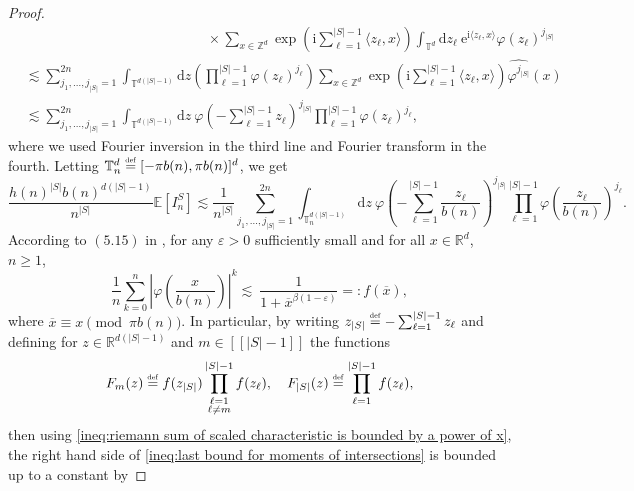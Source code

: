 \documentclass[10pt,a4paper]{amsart}
\newcommand{\RR}{\mathbb R}
\newcommand{\EE}{\mathbb E}
\newcommand{\TT}{\mathbb T}
\newcommand{\1}{\mathds{1}}
\newcommand{\ZZ}{\mathbb Z}
\renewcommand{\d}{\mathrm d}
\renewcommand{\i}{\mathrm i}
\newcommand{\eqdef}{\stackrel{\scaleto{\mathrm{def}}{3.5pt}}{=}}
\numberwithin{equation}{section}
\begin{document}
\begin{proof}
\begin{align*}
        &\hspace{13em}\times\sum_{x\in\ZZ^d}\exp\left(\i\sum_{\ell=1}^{|S|-1}\langle z_\ell, x\rangle\right)\int_{\TT^d}\d z_{\ell}\ \mathrm e^{\i\langle z_\ell,x\rangle}\varphi(z_\ell)^{j_{|S|}}\\
        &\lesssim\sum_{j_1,\dots,j_{|S|}=1}^{2n}\int_{\TT^{d(|S|-1)}}\d z\left(\prod_{\ell=1}^{|S|-1}\varphi(z_\ell)^{j_\ell}\right)\sum_{x\in\ZZ^d}\exp\left(\i\sum_{\ell=1}^{|S|-1}\langle z_\ell,x\rangle\right)\widehat{\varphi^{j_{|S|}}}(x)\\
        &\lesssim\sum_{j_1,\dots,j_{|S|}=1}^{2n}\int_{\TT^{d(|S|-1)}}\d z\ \varphi\left(-\sum_{\ell=1}^{|S|-1}z_\ell\right)^{j_{|S|}}\prod_{\ell=1}^{|S|-1}\varphi(z_\ell)^{j_\ell},
    \end{align*}
    where we used Fourier inversion in the third line and Fourier transform in the fourth. Letting $\TT_n^d\eqdef[-\pi b(n),\pi b(n)]^d$, we get
    \begin{equation}
    \label{ineq:last bound for moments of intersections}
        \frac{h(n)^{|S|}b(n)^{d(|S|-1)}}{n^{|S|}}\EE\left[I_n^S\right]\lesssim\frac{1}{n^{|S|}}\sum_{j_1,\dots,j_{|S|}=1}^{2n}\int_{\TT_n^{d(|S|-1)}}\d z\ \varphi\left(-\sum_{\ell=1}^{|S|-1}\frac{z_\ell}{b(n)}\right)^{j_{|S|}}\prod_{\ell=1}^{|S|-1}\varphi\left(\frac{z_\ell}{b(n)}\right)^{j_\ell}.
    \end{equation}
    According to $(5.15)$ in \cite{RosenRandomWalks&IntersectionLocalTimes1990}, for any $\varepsilon>0$ sufficiently small and for all $x\in\RR^d$, $n\ge1$,
    \begin{equation}
    \label{ineq:riemann sum of scaled characteristic is bounded by a power of x}
        \frac{1}{n}\sum_{k=0}^n\left|\varphi\left(\frac{x}{b(n)}\right)\right|^k\lesssim\ \frac{1}{1+\overline x^{\beta(1-\varepsilon)}}=:f(\overline x),
    \end{equation}
    where $\overline{x}\equiv x\pmod{\pi b(n)} $. In particular, by writing $z_{|S|}\eqdef-\sum_{\ell=1}^{|S|-1}z_\ell$ and defining for $z\in\RR^{d(|S|-1)}$ and $m\in[\![|S|-1]\!]$ the functions
    \begin{equation*}
        F_m(z)\eqdef f(z_{|S|})\prod_{\substack{\ell=1 \\ \ell\ne m}}^{|S|-1}f(z_\ell),\quad  
        F_{|S|}(z)\eqdef\prod_{\ell=1}^{|S|-1}f(z_\ell),
    \end{equation*}
    then using \eqref{ineq:riemann sum of scaled characteristic is bounded by a power of x}, the right hand side of \eqref{ineq:last bound for moments of intersections} is bounded up to a constant by 

\end{proof}
\end{document}
